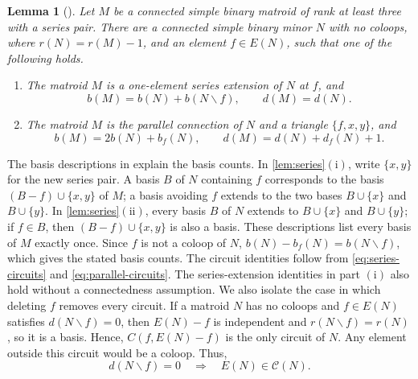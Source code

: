 \documentclass[11pt]{article}
\numberwithin{equation}{section}
\newtheorem{lemma}[lemma]{Lemma}
\newcommand{\CC}{\mathcal C}
\begin{document}
\begin{lemma}[{\cite[proof of Theorem~3.1, pp.~177--178]{Oxley1983}}]\label{lem:series}
Let \(M\) be a connected simple binary matroid of rank at least
three with a series pair. There are a connected simple binary minor
\(N\) with no coloops, where \(r(N)=r(M)-1\), and an element
\(f\in E(N)\), such that one of the following holds.
\begin{enumerate}
\item[\(\mathrm{(i)}\)] The matroid \(M\) is a one-element series
extension of \(N\) at \(f\), and
\[
 b(M)=b(N)+b(N\backslash f),\qquad d(M)=d(N).
\]
\item[\(\mathrm{(ii)}\)] The matroid \(M\) is the parallel connection
of \(N\) and a triangle \(\{f,x,y\}\), and
\[
 b(M)=2b(N)+b_f(N),\qquad d(M)=d(N)+d_f(N)+1.
\]
\end{enumerate}
\end{lemma}
The basis descriptions in \cite[Proposition~7.1.13(i),(ii)]{Oxley2011}
explain the basis counts.
In \autoref{lem:series}\(\mathrm{(i)}\), write \(\{x,y\}\) for the new series
pair. A basis \(B\) of \(N\) containing \(f\) corresponds to the basis
\((B-f)\cup\{x,y\}\) of \(M\); a basis avoiding \(f\) extends to the two
bases \(B\cup\{x\}\) and \(B\cup\{y\}\).
In \autoref{lem:series}\(\mathrm{(ii)}\), every basis \(B\) of \(N\) extends to
\(B\cup\{x\}\) and \(B\cup\{y\}\); if \(f\in B\), then
\((B-f)\cup\{x,y\}\) is also a basis. These descriptions list every basis
of \(M\) exactly once.
Since \(f\) is not a coloop of \(N\),
\(b(N)-b_f(N)=b(N\backslash f)\), which gives the stated basis counts.
The circuit identities follow from \eqref{eq:series-circuits}
and \eqref{eq:parallel-circuits}.
The series-extension identities in part \(\mathrm{(i)}\) also hold
without a connectedness assumption.
We also isolate the case in which deleting \(f\) removes every circuit.
If a matroid \(N\) has no coloops and \(f\in E(N)\) satisfies
\(d(N\backslash f)=0\), then \(E(N)-f\) is independent and
\(r(N\backslash f)=r(N)\), so it is a basis.
Hence, \(C(f,E(N)-f)\) is the only circuit of \(N\).
Any element outside this circuit would be a coloop. Thus,
\begin{equation}\label{eq:circuit-case}
 d(N\backslash f)=0\quad\Longrightarrow\quad E(N)\in\CC(N).
\end{equation}
\end{document}
